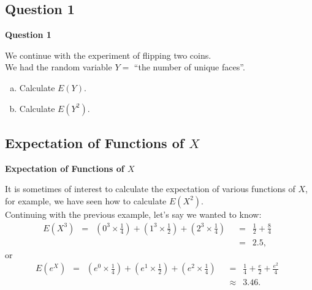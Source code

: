 \documentclass[compress]{beamer}        %
\makeatletter
\newcommand{\tcb}{\textcolor{beamer@blendedblue}}
\makeatother
\begin{document}
\subsection{Question 1}
\begin{frame}{\bf \tcb{Question 1}}

We continue with the experiment of flipping two coins.\\[0.3cm]

We had the random variable $Y =$ ``the number of unique faces''.\\[0.3cm]

\begin{enumerate}[a)]\itemsep0.3cm
\item Calculate $E(Y)$.
\item Calculate $E(Y^2)$.
\end{enumerate}



\end{frame}



\subsection{Expectation of Functions of $X$}
\begin{frame}{\bf \tcb{Expectation of Functions of $X$}}

It is sometimes of interest to calculate the expectation of various functions of $X$, for example, we have seen how to calculate $E(X^2)$.\\[0.4cm]

Continuing with the previous example, let's say we wanted to know:
\begin{align*}
E(X^3) \,\,\,=\,\,\, \left(0^3\times\frac{1}{4}\right) + \left(1^3\times\frac{1}{2}\right) + \left(2^3\times\frac{1}{4}\right) \,\,\,&=\,\,\, \frac{1}{2} + \frac{8}{4} \,\,\,\\&=\,\,\, 2.5,
\end{align*}
or
\begin{align*}
E(e^X) \,\,\,=\,\,\, \left(e^0\times\frac{1}{4}\right) + \left(e^1\times\frac{1}{2}\right) + \left(e^2\times\frac{1}{4}\right) \,\,\,&=\,\,\, \frac{1}{4} + \frac{e}{2} + \frac{e^2}{4} \,\,\,\\
&\approx\,\,\, 3.46.
\end{align*}

\end{frame}
\end{document}
